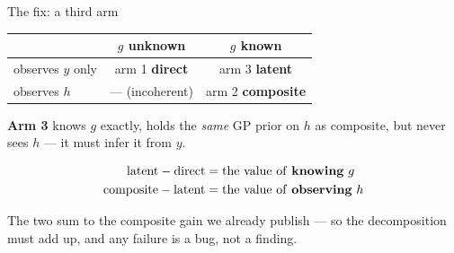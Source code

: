\documentclass[aspectratio=169,11pt]{beamer}
\begin{document}
\begin{frame}{The fix: a third arm}

\begin{center}
\begin{tabular}{lcc}
\toprule
 & $g$ unknown & $g$ known \\
\midrule
observes $y$ only & arm 1 \textbf{direct} & \alert{arm 3 \textbf{latent}} \\
observes $h$      & --- (incoherent)      & arm 2 \textbf{composite} \\
\bottomrule
\end{tabular}
\end{center}

\bigskip
\textbf{Arm 3} knows $g$ exactly, holds the \emph{same} GP prior on $h$ as
composite, but never sees $h$ --- it must infer it from $y$.

\bigskip
\begin{align*}
\text{latent} - \text{direct}    &= \text{the value of \textbf{knowing} } g\\
\text{composite} - \text{latent} &= \text{the value of \textbf{observing} } h
\end{align*}

\medskip
The two sum to the composite gain we already publish --- so the decomposition
must add up, and any failure is a bug, not a finding.

\end{frame}
\end{document}
